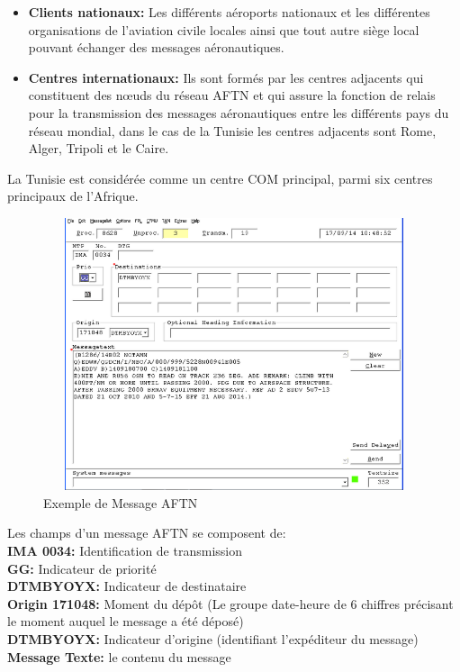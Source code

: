 	\begin{itemize}
    \item \textbf{Clients nationaux:} Les différents aéroports nationaux et les différentes organisations de l’aviation civile locales ainsi que tout autre siège local pouvant échanger des messages aéronautiques. \\
    
    \item \textbf{Centres internationaux:} Ils sont formés par les centres adjacents qui constituent des nœuds du réseau AFTN et qui assure la fonction de relais pour la transmission des messages aéronautiques entre les différents pays du réseau mondial, dans le cas de la Tunisie les centres adjacents sont Rome, Alger, Tripoli et le Caire.\\

	\end{itemize}

La Tunisie est considérée comme un centre COM principal, parmi six centres principaux de l’Afrique. \\

\begin{figure}[!h]
\begin{center}
\includegraphics[width=14cm,height=8cm]{presentation/ftn.png}
\end{center}
\caption{Exemple de Message AFTN}
\end{figure}
Les champs d’un message AFTN se composent de:\\
\textbf{IMA 0034:} Identification de transmission\\
\textbf{GG:} Indicateur de priorité\\
\textbf{DTMBYOYX:} Indicateur de destinataire \\
\textbf{Origin 171048:} Moment du dépôt (Le groupe date-heure de 6 chiffres précisant le moment auquel le message a été déposé) \\
\textbf{DTMBYOYX:} Indicateur d’origine (identifiant l’expéditeur du message) \\
\textbf{Message Texte:} le contenu du message \\
